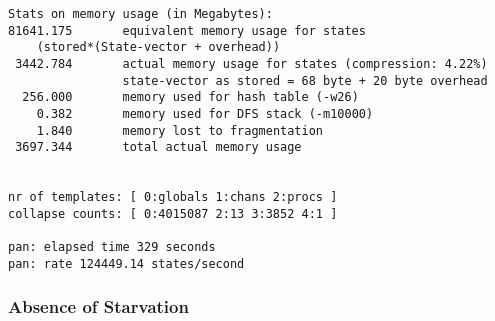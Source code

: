\documentclass{llncs}
\begin{document}
\begin{lstlisting}[frame=single]
Stats on memory usage (in Megabytes):
81641.175       equivalent memory usage for states 
    (stored*(State-vector + overhead))
 3442.784       actual memory usage for states (compression: 4.22%)
                state-vector as stored = 68 byte + 20 byte overhead
  256.000       memory used for hash table (-w26)
    0.382       memory used for DFS stack (-m10000)
    1.840       memory lost to fragmentation
 3697.344       total actual memory usage


nr of templates: [ 0:globals 1:chans 2:procs ]
collapse counts: [ 0:4015087 2:13 3:3852 4:1 ]

pan: elapsed time 329 seconds
pan: rate 124449.14 states/second
\end{lstlisting}

\subsubsection{Absence of Starvation}
\label{mc:app:unb:dead}
\end{document}

